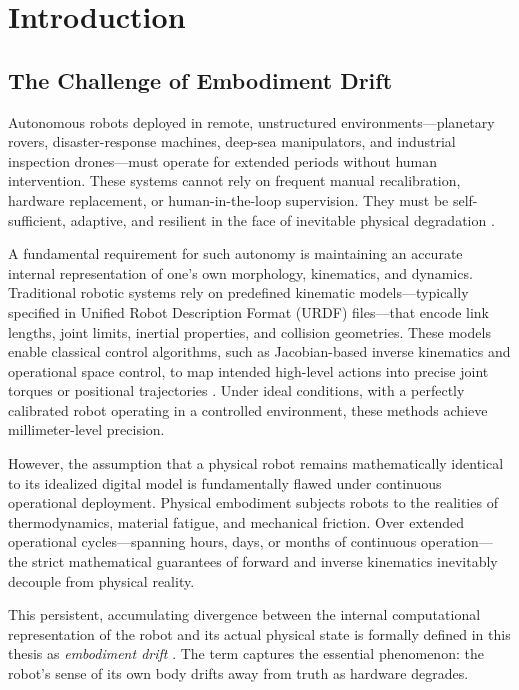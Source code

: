 \documentclass[12pt,a4paper,oneside]{report}
\begin{document}

\chapter{Introduction}
\label{chap:intro}
\section{The Challenge of Embodiment Drift}
\label{sec:challenge_embodiment_drift}

Autonomous robots deployed in remote, unstructured environments---planetary rovers, disaster-response machines, deep-sea manipulators, and industrial inspection drones---must operate for extended periods without human intervention. These systems cannot rely on frequent manual recalibration, hardware replacement, or human-in-the-loop supervision. They must be self-sufficient, adaptive, and resilient in the face of inevitable physical degradation \cite{bongard2006resilient, cully2015robots}.

A fundamental requirement for such autonomy is maintaining an accurate internal representation of one's own morphology, kinematics, and dynamics. Traditional robotic systems rely on predefined kinematic models---typically specified in Unified Robot Description Format (URDF) files---that encode link lengths, joint limits, inertial properties, and collision geometries. These models enable classical control algorithms, such as Jacobian-based inverse kinematics and operational space control, to map intended high-level actions into precise joint torques or positional trajectories \cite{siciliano2009robotics}. Under ideal conditions, with a perfectly calibrated robot operating in a controlled environment, these methods achieve millimeter-level precision.

However, the assumption that a physical robot remains mathematically identical to its idealized digital model is fundamentally flawed under continuous operational deployment. Physical embodiment subjects robots to the realities of thermodynamics, material fatigue, and mechanical friction. Over extended operational cycles---spanning hours, days, or months of continuous operation---the strict mathematical guarantees of forward and inverse kinematics inevitably decouple from physical reality.

This persistent, accumulating divergence between the internal computational representation of the robot and its actual physical state is formally defined in this thesis as \textit{embodiment drift} \cite{bongard2006resilient, kwiatkowski2019task}. The term captures the essential phenomenon: the robot's sense of its own body drifts away from truth as hardware degrades.
\end{document}
